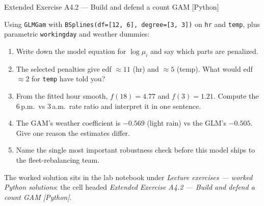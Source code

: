 \documentclass[aspectratio=169,11pt]{beamer}
\begin{document}
\begin{frame}{Extended Exercise A4.2 --- Build and defend a count GAM [Python]}
\begin{longexercise}
  \scriptsize
  Using \texttt{GLMGam} with \texttt{BSplines(df=[12, 6], degree=[3, 3])} on
  \texttt{hr} and \texttt{temp}, plus parametric \texttt{workingday} and weather
  dummies:
  \begin{enumerate}
    \item Write down the model equation for $\log\mu_i$ and say which parts are
          penalized.
    \item The selected penalties give edf $\approx 11$ (hr) and $\approx 5$ (temp).
          What would edf $\approx 2$ for \texttt{temp} have told you?
    \item From the fitted hour smooth, $f(18) = 4.77$ and $f(3) = 1.21$. Compute the
          6\,p.m.\ vs 3\,a.m.\ rate ratio and interpret it in one sentence.
    \item The GAM's weather coefficient is $-0.569$ (light rain) vs the GLM's
          $-0.505$. Give one reason the estimates differ.
    \item Name the single most important robustness check before this model ships to
          the fleet-rebalancing team.
  \end{enumerate}
\end{longexercise}
\begin{labnote}
  The worked solution sits in the lab notebook under \emph{Lecture exercises ---
  worked Python solutions}: the cell headed
  \emph{Extended Exercise A4.2 --- Build and defend a count GAM [Python]}.
\end{labnote}
\end{frame}
\end{document}
